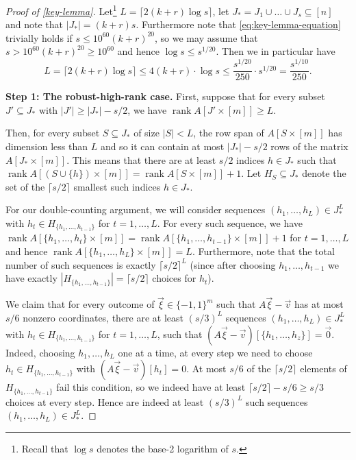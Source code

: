 \documentclass[english]{article}
\theoremstyle{remark}
\numberwithin{equation}{section}
\numberwithin{figure}{section}
\newcommand{\su}{\subseteq}
\newcommand{\rank}{\operatorname{rank}}
\newcommand{\on}{\operatorname}
\begin{document}
\begin{proof}[Proof of \cref{key-lemma}]
Let\footnote{Recall that $\log s$ denotes the base-2 logarithm of $s$.} $L=\lceil 2(k+r)\log s\rceil$, let $J_*=J_1\cup\dots\cup J_s\su [n]$ and note that $|J_*|=(k+r)s$. Furthermore note that \eqref{eq:key-lemma-equation} trivially holds if $s\le 10^{60}(k+r)^{20}$, so we may assume that $s>10^{60}(k+r)^{20}\ge 10^{60}$ and hence $\log s\le s^{1/20}$. Then we in particular have
\begin{equation}\label{eq:bound-for-L}
L=\lceil 2(k+r)\log s\rceil\le 4(k+r)\cdot \log s\le \frac{s^{1/20}}{250}\cdot s^{1/20}=\frac{s^{1/10}}{250}.
\end{equation}

\textbf{Step 1: The robust-high-rank case.} First, suppose that for every subset $J'\subseteq J_*$ with $|J'|\ge |J_*|-s/2$, we have $\rank A[J'\times [m]]\ge L$.

Then, for every subset $S\su J_*$ of size $|S|<L$, the row span of $A[S\times [m]]$ has dimension less than $L$ and so it can contain at most $|J_*|-s/2$ rows of the matrix $A[J_*\times [m]]$. This means that there are at least $s/2$ indices $h\in J_*$ such that $\on{rank} A[(S\cup \{h\})\times [m]]=\on{rank} A[S\times [m]]+1$. Let $H_S\su J_*$ denote the set of the $\lceil s/2\rceil$ smallest such indices $h\in J_*$.

For our double-counting argument, we will consider sequences $(h_{1},\dots,h_{L})\in J_*^L$ with $h_{t}\in H_{\{h_1,\dots,h_{t-1}\}}$ for $t=1,\dots,L$. For every such sequence, we have $\on{rank} A[\{h_{1},\dots,h_{t}\}\times [m]]=\on{rank} A[\{h_{1},\dots,h_{t-1}\}\times [m]]+1$ for $t=1,\dots,L$ and hence  $\on{rank} A[\{h_{1},\dots,h_{L}\}\times [m]]=L$. Furthermore, note that the total number of such sequences is exactly $\lceil s/2\rceil^L$ (since after choosing $h_1,\dots,h_{t-1}$ we have exactly $|H_{\{h_1,\dots,h_{t-1}\}}|=\lceil s/2\rceil$ choices for $h_t$).

We claim that for every outcome of $\vec{\xi}\in \{-1,1\}^m$ such that $A\vec{\xi}-\vec{v}$ has at most $s/6$ nonzero coordinates, there are at least $(s/3)^L$ sequences $(h_{1},\dots,h_{L})\in J_*^L$ with $h_{t}\in H_{\{h_1,\dots,h_{t-1}\}}$ for $t=1,\dots,L$, such that $(A\vec{\xi}-\vec{v})[\{h_1,\dots,h_z\}]=\vec 0$.  Indeed, choosing $h_{1},\dots,h_{L}$ one at a time, at every step we need to choose $h_{t}\in H_{\{h_1,\dots,h_{t-1}\}}$ with $(A\vec{\xi}-\vec{v})[h_{t}]=0$. At most $s/6$ of the $\lceil s/2\rceil$ elements of $H_{\{h_1,\dots,h_{t-1}\}}$ fail this condition, so we indeed have at least $\lceil s/2\rceil-s/6\ge s/3$ choices at every step. Hence are indeed at least $(s/3)^L$ such sequences $(h_{1},\dots,h_{L})\in J_*^L$.


\end{proof}
\end{document}
